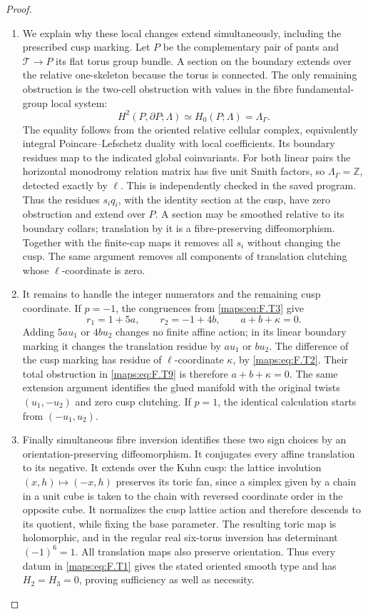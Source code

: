 \documentclass[11pt,a4paper]{article}
\theoremstyle{definition}
\begin{document}
\begin{proof}
\begin{enumerate}[label=\arabic*.]
\item We explain why these local changes extend simultaneously,
including the prescribed cusp marking.
Let $P$ be the complementary pair of pants and
$\mathcal T\to P$ its flat torus group bundle.
A section on the boundary extends over the relative
one-skeleton because the torus is connected.
The only remaining obstruction is the two-cell obstruction
with values in the fibre fundamental-group local system:
\[
 H^2(P,\partial P;\Lambda)
        \simeq H_0(P;\Lambda)=\Lambda_\Gamma.
 \tag{F.T9}\label{maps:eq:F.T9}
\]
The equality follows from the oriented relative cellular
complex, equivalently integral Poincare--Lefschetz duality
with local coefficients.  Its boundary residues map to
the indicated global coinvariants.
For both linear pairs the horizontal monodromy relation
matrix has five unit Smith factors, so
$\Lambda_\Gamma=\mathbb Z$, detected exactly by $\ell$.
This is independently checked in the saved program.
Thus the residues $s_iq_i$, with the identity section at the
cusp, have zero obstruction and extend over $P$.
A section may be smoothed relative to its boundary collars;
translation by it is a fibre-preserving diffeomorphism.
Together with the finite-cap maps it removes all $s_i$
without changing the cusp.
The same argument removes all components of translation
clutching whose $\ell$-coordinate is zero.

\item It remains to handle the integer numerators and the remaining
cusp coordinate.  If $p=-1$, the congruences from \eqref{maps:eq:F.T3}
give
\[
 r_1=1+5a,\qquad r_2=-1+4b,
 \qquad a+b+\kappa=0.
 \tag{F.T10}\label{maps:eq:F.T10}
\]
Adding $5a u_1$ or $4b u_2$ changes no finite affine action;
in its linear boundary marking it changes the translation
residue by $a u_1$ or $b u_2$.
The difference of the cusp marking has residue of
$\ell$-coordinate $\kappa$, by \eqref{maps:eq:F.T2}.
Their total obstruction in \eqref{maps:eq:F.T9} is therefore
$a+b+\kappa=0$.
The same extension argument identifies the glued manifold
with the original twists $(u_1,-u_2)$ and zero cusp
clutching.
If $p=1$, the identical calculation starts from
$(-u_1,u_2)$.

\item Finally simultaneous fibre inversion identifies these two
sign choices by an orientation-preserving diffeomorphism.
It conjugates every affine translation to its negative.
It extends over the Kuhn cusp: the lattice involution
$(x,h)\mapsto(-x,h)$ preserves its toric fan, since a
simplex given by a chain in a unit cube is taken to the
chain with reversed coordinate order in the opposite cube.
It normalizes the cusp lattice action and therefore descends
to its quotient, while fixing the base parameter.  The resulting toric map is holomorphic,
and in the regular real six-torus inversion has determinant
$(-1)^6=1$.  All translation maps also preserve orientation.
Thus every datum in \eqref{maps:eq:F.T1} gives the stated oriented smooth
type and has $H_2=H_3=0$, proving sufficiency as well as
necessity.

\end{enumerate}
\end{proof}
\end{document}
